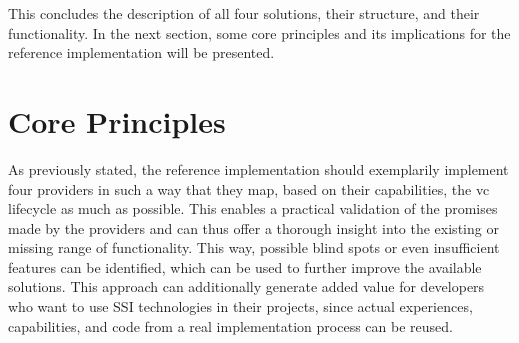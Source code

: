     This concludes the description of all four solutions, their structure, and their functionality. In the next section, some core principles and its implications for the reference implementation will be presented.
    \newpage

	\section{Core Principles}\label{section: core principles}
	
	As previously stated, the reference implementation should exemplarily implement four providers in such a way that they map, based on their capabilities, the \ac{vc} lifecycle as much as possible. This enables a practical validation of the promises made by the providers and can thus offer a thorough insight into the existing or missing range of functionality. This way, possible blind spots or even insufficient features can be identified, which can be used to further improve the available solutions. This approach can additionally generate added value for developers who want to use \ac{SSI} technologies in their projects, since actual experiences, capabilities, and code from a real implementation process can be reused.
    
